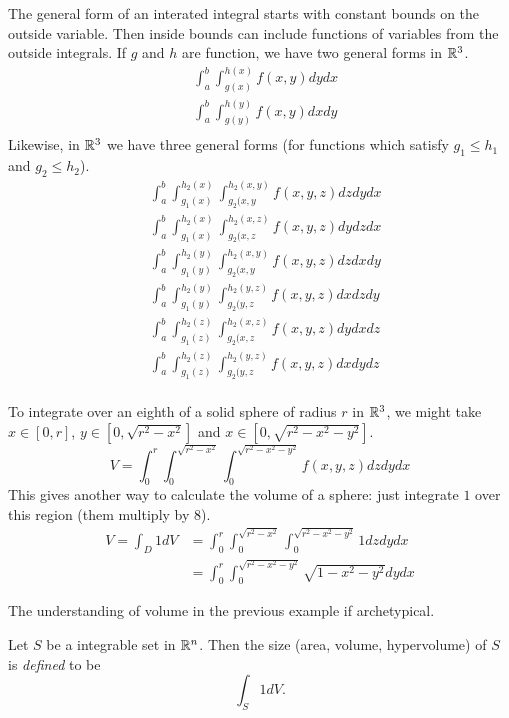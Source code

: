 \documentclass[fleqn,letterpaper]{report}
\begin{document}
The general form of an interated integral starts with constant
bounds on the outside variable. Then inside bounds can include
functions of variables from the outside integrals. If $g$ and
$h$ are function, we have two general forms in $\mathbb{R}^3$.
\begin{align*}
& \int_a^b \int_{g(x)}^{h(x)} f(x,y) dy dx \\
& \int_a^b \int_{g(y)}^{h(y)} f(x,y) dx dy \\
\end{align*} 
Likewise, in $\mathbb{R}^3$ we have three general forms (for
functions which satisfy $g_1 \leq h_1$ and $g_2 \leq h_2$).
\begin{align*}
& \int_a^b \int_{g_1(x)}^{h_2(x)} \int_{g_2(x,y}^{h_2(x,y)}
f(x,y,z) dz dy dx \\
& \int_a^b \int_{g_1(x)}^{h_2(x)} \int_{g_2(x,z}^{h_2(x,z)}
f(x,y,z) dy dz dx \\
& \int_a^b \int_{g_1(y)}^{h_2(y)} \int_{g_2(x,y}^{h_2(x,y)}
f(x,y,z) dz dx dy \\
& \int_a^b \int_{g_1(y)}^{h_2(y)} \int_{g_2(y,z}^{h_2(y,z)}
f(x,y,z) dx dz dy \\
& \int_a^b \int_{g_1(z)}^{h_2(z)} \int_{g_2(x,z}^{h_2(x,z)}
f(x,y,z) dy dx dz \\
& \int_a^b \int_{g_1(z)}^{h_2(z)} \int_{g_2(y,z}^{h_2(y,z)}
f(x,y,z) dx dy dz \\
\end{align*} 

\begin{example}
To integrate over an eighth of a solid sphere of radius $r$ in
$\mathbb{R}^3$, we might take $x \in [0,r]$, $y \in [0,
\sqrt{r^2-x^2}]$ and $x \in [0, \sqrt{r^2 - x^2 - y^2}]$.
\begin{equation*}
V = \int_0^r \int_0^{\sqrt{r^2-x^2}} \int_0^{\sqrt{r^2 - x^2 -
y^2}} f(x,y,z) dz dy dx
\end{equation*}
This gives another way to calculate the volume of a sphere:
just integrate $1$ over this region (them multiply by 8).
\begin{align*}
V = \int_D 1 dV & = \int_0^r \int_0^{\sqrt{r^2-x^2}}
\int_0^{\sqrt{r^2 - x^2 - y^2}} 1 dz dy dx \\
& = \int_0^r \int_0^{\sqrt{r^2 - x^2 - y^2}} \sqrt{1-x^2 -
y^2} dy dx
\end{align*}
\end{example}

The understanding of volume in the previous example if
archetypical.

\begin{defn}
Let $S$ be a integrable set in $\mathbb{R}^n$. Then the size (area,
volume, hypervolume) of $S$ is \emph{defined} to be 
\begin{equation*}
\int_S 1 dV.
\end{equation*}
\end{defn}
\end{document}
